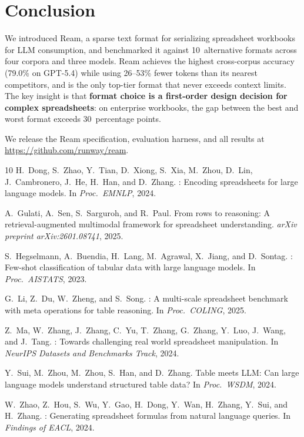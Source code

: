 \documentclass[11pt]{article}
\begin{document}
\section{Conclusion}
\label{sec:conclusion}

We introduced Ream, a sparse text format for serializing spreadsheet workbooks for LLM consumption, and benchmarked it against 10~alternative formats across four corpora and three models.
Ream achieves the highest cross-corpus accuracy (79.0\% on GPT-5.4) while using 26--53\% fewer tokens than its nearest competitors, and is the only top-tier format that never exceeds context limits.
The key insight is that \textbf{format choice is a first-order design decision for complex spreadsheets}: on enterprise workbooks, the gap between the best and worst format exceeds 30~percentage points.

We release the Ream specification, evaluation harness, and all results at \url{https://github.com/runway/ream}.


\begin{thebibliography}{10}
H.~Dong, S.~Zhao, Y.~Tian, D.~Xiong, S.~Xia, M.~Zhou, D.~Lin, J.~Cambronero, J.~He, H.~Han, and D.~Zhang.
: Encoding spreadsheets for large language models.
\newblock In \emph{Proc.\ EMNLP}, 2024.

A.~Gulati, A.~Sen, S.~Sarguroh, and R.~Paul.
\newblock From rows to reasoning: A retrieval-augmented multimodal framework for spreadsheet understanding.
\newblock \emph{arXiv preprint arXiv:2601.08741}, 2025.

S.~Hegselmann, A.~Buendia, H.~Lang, M.~Agrawal, X.~Jiang, and D.~Sontag.
: Few-shot classification of tabular data with large language models.
\newblock In \emph{Proc.\ AISTATS}, 2023.

G.~Li, Z.~Du, W.~Zheng, and S.~Song.
: A multi-scale spreadsheet benchmark with meta operations for table reasoning.
\newblock In \emph{Proc.\ COLING}, 2025.

Z.~Ma, W.~Zhang, J.~Zhang, C.~Yu, T.~Zhang, G.~Zhang, Y.~Luo, J.~Wang, and J.~Tang.
: Towards challenging real world spreadsheet manipulation.
\newblock In \emph{NeurIPS Datasets and Benchmarks Track}, 2024.

Y.~Sui, M.~Zhou, M.~Zhou, S.~Han, and D.~Zhang.
\newblock Table meets {LLM}: Can large language models understand structured table data?
\newblock In \emph{Proc.\ WSDM}, 2024.

W.~Zhao, Z.~Hou, S.~Wu, Y.~Gao, H.~Dong, Y.~Wan, H.~Zhang, Y.~Sui, and H.~Zhang.
: Generating spreadsheet formulas from natural language queries.
\newblock In \emph{Findings of EACL}, 2024.
\end{thebibliography}
\end{document}
